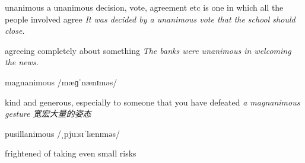 \begin{DefWord}{unanimous}
    a unanimous decision, vote, agreement etc is one in which all the people involved agree
    \textit{It was decided by a unanimous vote that the school should close.}

    agreeing completely about something
    \textit{The banks were unanimous in welcoming the news.}
\end{DefWord}

\begin{DefWord}{magnanimous}
    /mæɡˈnænɪməs/

    kind and generous, especially to someone that you have defeated
    \textit{a magnanimous gesture 宽宏大量的姿态}
\end{DefWord}

\begin{DefWord}{pusillanimous}
    /ˌpjuːsɪˈlænɪməs/
    
    frightened of taking even small risks
\end{DefWord}